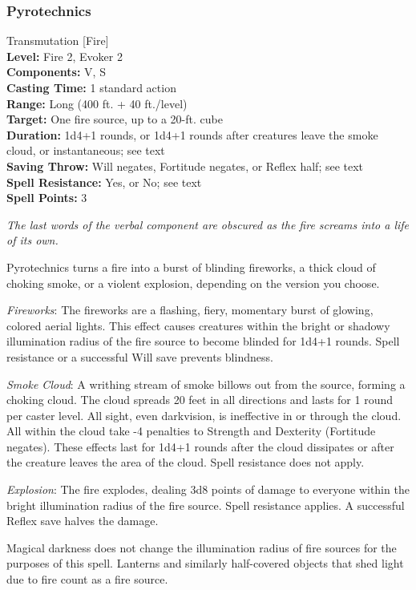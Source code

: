 \subsubsection{Pyrotechnics}
\label{Spell:Pyrotechnics}
Transmutation [Fire]
\\ \textbf{Level:} Fire 2, Evoker 2
\\ \textbf{Components:} V, S
\\ \textbf{Casting Time:} 1 standard action
\\ \textbf{Range:} Long (400 ft. + 40 ft./level)
\\ \textbf{Target:} One fire source, up to a 20-ft. cube
\\ \textbf{Duration:} 1d4+1 rounds, or 1d4+1 rounds after creatures leave the smoke cloud, or instantaneous; see text
\\ \textbf{Saving Throw:} Will negates, Fortitude negates, or Reflex half; see text
\\ \textbf{Spell Resistance:} Yes, or No; see text
\\ \textbf{Spell Points:} 3

\emph{The last words of the verbal component are obscured as the fire screams into a life of its own.}

Pyrotechnics turns a fire into a burst of blinding fireworks, a thick cloud of choking smoke, or a violent explosion, depending on the version you choose.

\begin{list}{}{\leftmargin=1em}
 \item \emph{Fireworks}:
The fireworks are a flashing, fiery, momentary burst of glowing, colored aerial lights. 
This effect causes creatures within the bright or shadowy illumination radius of the fire source to become blinded for 1d4+1 rounds. Spell resistance or a successful Will save prevents blindness.
 \item \emph{Smoke Cloud}: A writhing stream of smoke billows out from the source, forming a choking cloud. 
The cloud spreads 20 feet in all directions and lasts for 1 round per caster level. 
All sight, even darkvision, is ineffective in or through the cloud. 
All within the cloud take -4 penalties to Strength and Dexterity (Fortitude negates). 
These effects last for 1d4+1 rounds after the cloud dissipates or after the creature leaves the area of the cloud. Spell resistance does not apply.
 \item \emph{Explosion}: The fire explodes, dealing 3d8 points of damage to everyone within the bright illumination radius of the fire source. Spell resistance applies. A successful Reflex save halves the damage.
\end{list}
Magical darkness does not change the illumination radius of fire sources for the purposes of this spell.
Lanterns and similarly half-covered objects that shed light due to fire count as a fire source.

